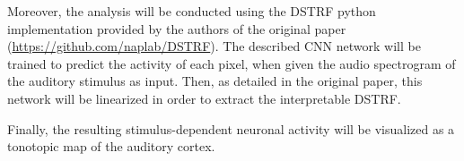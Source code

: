 Moreover, the analysis will be conducted using the DSTRF python implementation provided by the authors of the original paper (\url{https://github.com/naplab/DSTRF}). The described CNN network will be trained to predict the activity of each pixel, when given the audio spectrogram of the auditory stimulus as input. Then, as detailed in the original paper, this network will be linearized in order to extract the interpretable DSTRF.

Finally, the resulting stimulus-dependent neuronal activity will be visualized as a tonotopic map of the auditory cortex.